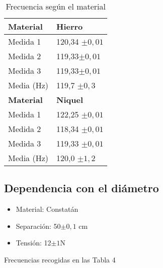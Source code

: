 \documentclass[a4paper,12pt,spanish]{article}
\begin{document}
\begin{table}[H]
\begin{minipage}[t]{.48\linewidth}
	\end{minipage}\hfill
	\mbox{}
	\begin{minipage}[t]{.48\linewidth}%
		\centering
		\begin{tabular}{|l|l|}
			\hline
			\textbf{Material} & \textbf{Hierro}    \\ \hline
			Medida 1          &120,34 $\pm 0,01$        \\ \hline
			Medida 2          & 119,33$\pm 0,01$            \\ \hline
			Medida 3          & 119,33$\pm 0,01$	            \\ \hline
			Media (Hz)         &119,7 $\pm 0,3$           \\ \hline\hline
			\textbf{Material} & \textbf{Niquel}    \\ \hline
			Medida 1          & 122,25  $\pm 0,01$          \\ \hline
			Medida 2          & 118,34 $\pm 0,01$           \\ \hline
			Medida 3          & 119,33 $\pm 0,01$           \\ \hline
			Media (Hz)         & 120,0  $\pm 1,2$         \\ \hline
		\end{tabular}
		
	\end{minipage}\hfill
	\mbox{}
	\caption{Frecuencia según el material}
\end{table}



\subsection{Dependencia con el diámetro}

\begin{itemize}
	\item{Material: Constatán}
	\item{Separación: 50$\pm 0,1$ cm}
	\item{Tensión: 12$\pm 1$N}
\end{itemize}

Frecuencias recogidas en las Tabla 4
\end{document}
